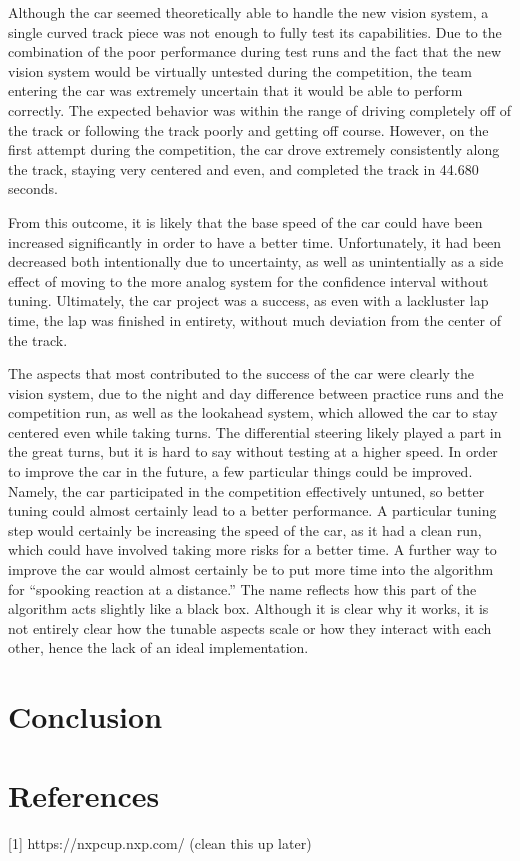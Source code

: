 \documentclass[conference]{IEEEtran}
\begin{document}
    Although the car seemed theoretically able to handle the new vision system, a single curved track piece was not enough to fully test its capabilities.
    Due to the combination of the poor performance during test runs and the fact that the new vision system would be virtually untested during the competition, the team entering the car
    was extremely uncertain that it would be able to perform correctly.
    The expected behavior was within the range of driving completely off of the track or following the track poorly and getting off course.
    However, on the first attempt during the competition, the car drove extremely consistently along the track, staying very centered and even, and completed the track in 44.680 seconds.

    From this outcome, it is likely that the base speed of the car could have been increased significantly in order to have a better time. Unfortunately, it had been decreased both intentionally
    due to uncertainty, as well as unintentially as a side effect of moving to the more analog system for the confidence interval without tuning. Ultimately, the car project was a success, as even
    with a lackluster lap time, the lap was finished in entirety, without much deviation from the center of the track.

    The aspects that most contributed to the success of the car were clearly the vision system, due to the night and day difference between practice runs and the competition run, as well as the lookahead system,
    which allowed the car to stay centered even while taking turns. The differential steering likely played a part in the great turns, but it is hard to say without testing at a higher speed. In order to improve
    the car in the future, a few particular things could be improved. Namely, the car participated in the competition effectively untuned, so better tuning could almost certainly lead to a better performance.
    A particular tuning step would certainly be increasing the speed of the car, as it had a clean run, which could have involved taking more risks for a better time.
    A further way to improve the car would almost certainly be to put more time into the algorithm for ``spooking reaction at a distance.''
    The name reflects how this part of the algorithm acts slightly like a black box. 
    Although it is clear why it works, it is not entirely clear how the tunable aspects scale or how they interact with each other, hence the lack of an ideal implementation.

\section{Conclusion}


\section{References}
[1] https://nxpcup.nxp.com/ (clean this up later)

\begin{thebibliography}{00}
    \end{thebibliography}
\end{document}
